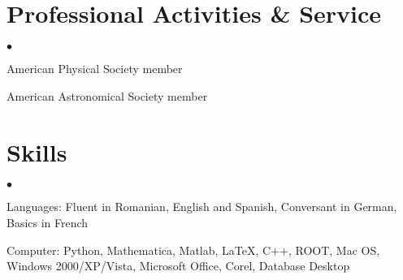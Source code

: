 \documentclass[margin,line]{res}
\newenvironment{list2}{
  \begin{list}{$\bullet$}{%
      \setlength{\itemsep}{0in}
      \setlength{\parsep}{0in} \setlength{\parskip}{0in}
      \setlength{\topsep}{0in} \setlength{\partopsep}{0in} 
      \setlength{\leftmargin}{0.2in}}}{\end{list}}
\begin{document}
\begin{resume}
%
%
%

\section{\sc Professional Activities \& Service}
\begin{list2}
\item[] American Physical Society member
\item[] American Astronomical Society member
\end{list2}

\section{\sc Skills}
\begin{list2}
\item[] Languages: Fluent in Romanian, English and Spanish, Conversant in German, Basics in French
\item[] Computer: Python, Mathematica, Matlab, LaTeX, C++, ROOT, Mac OS, Windows 2000/XP/Vista, Microsoft Office, Corel, Database Desktop
\end{list2}


\end{resume}
\end{document}
